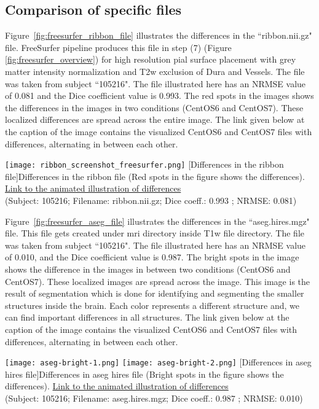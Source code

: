 \subsection{Comparison of specific files}
Figure~\ref{fig:freesurfer_ribbon_file} illustrates the differences in the ``ribbon.nii.gz" file. FreeSurfer pipeline produces this file in step (7) (Figure \ref{fig:freesurfer_overview}) for high resolution pial surface placement with grey matter intensity normalization and T2w exclusion of Dura and Vessels.
The file was taken from subject ``105216". The file illustrated here has an NRMSE value of 0.081 and the Dice coefficient value is 0.993. The red spots in the images shows the differences in the images in two conditions (CentOS6 and CentOS7). These localized differences are spread across the entire image.
The link given below at the caption of the image contains the visualized CentOS6 and CentOS7 files with differences, alternating in between each other.

\begin{center}
\texttt{[image: ribbon\_screenshot\_freesurfer.png]}
[Differences in the ribbon file]{Differences in the ribbon file (Red spots in the figure shows the differences). \href{https://drive.google.com/file/d/14nQNb9qNxqgpUrl4D1P6BYplXsGpNUx_/view?usp=sharing}{Link to the animated illustration of differences}\\(Subject: 105216; Filename: ribbon.nii.gz; Dice coeff.: 0.993 ; NRMSE: 0.081)}
\label{fig:freesurfer_ribbon_file}
\end{center}

Figure~\ref{fig:freesurfer_aseg_file} illustrates the differences in the ``aseg.hires.mgz" file. This file gets created under mri directory inside T1w file directory. The file was taken from subject ``105216". The file illustrated here has an NRMSE value of 0.010, and the Dice coefficient value is 0.987. The bright spots in the image shows the difference in the images in between two conditions (CentOS6 and CentOS7). These localized images are spread across the image. This image is the result of segmentation which is done for identifying and segmenting the smaller structures inside the brain. Each color represents a different structure and, we can find important differences in all structures. The link given below at the caption of the image contains the visualized CentOS6 and CentOS7 files with differences, alternating in between each other.

\begin{center}
\texttt{[image: aseg-bright-1.png]}%
\texttt{[image: aseg-bright-2.png]}
[Differences in aseg hires file]{Differences in aseg hires file (Bright spots in the figure shows the differences). \href{https://drive.google.com/file/d/1WUwWp5muXvotbMQqTqR5LcMyncH1ET3P/view?usp=sharing}{Link to the animated illustration of differences}\\(Subject: 105216; Filename: aseg.hires.mgz; Dice coeff.: 0.987 ; NRMSE: 0.010)}
\label{fig:freesurfer_aseg_file}
\end{center}

